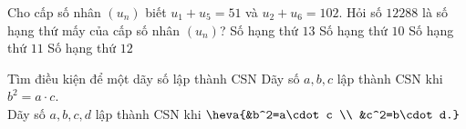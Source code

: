 \begin{ex}%
	Cho cấp số nhân $(u_n)$ biết $u_1+u_5=51$ và $u_2+u_6=102$. Hỏi số $12288$ là số hạng thứ mấy của cấp số nhân $(u_n)$?
	\choice
	{\True Số hạng thứ $13$}
	{Số hạng thứ $10$}
	{Số hạng thứ $11$}
	{Số hạng thứ $12$}
\end{ex}
\begin{dang}{Tìm điều kiện để một dãy số lập thành CSN}
	Dãy số $a, b, c$ lập thành CSN khi $b^2=a\cdot c$. \\
	Dãy số $a, b, c, d$ lập thành CSN khi $\heva{&b^2=a\cdot c \\ &c^2=b\cdot d.}$
\end{dang}
